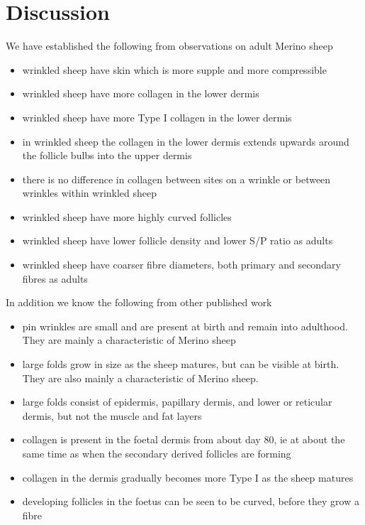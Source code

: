\documentclass[titlepage]{article}  %
\begin{document}
\section{Discussion}
We have established the following from observations on adult Merino sheep
\begin{itemize}
\item wrinkled sheep have skin which is more supple and more compressible
\item wrinkled sheep have more collagen in the lower dermis
\item wrinkled sheep have more Type I collagen in the lower dermis
\item in wrinkled sheep the collagen in the lower dermis extends upwards around the follicle bulbs into the upper dermis
\item there is no difference in collagen between sites on a wrinkle or between wrinkles within wrinkled sheep
\item wrinkled sheep have more highly curved follicles
\item wrinkled sheep have lower follicle density and lower S/P ratio as adults
\item wrinkled sheep have coarser fibre diameters, both primary and secondary fibres as adults
\end{itemize}

In addition we know the following from other published work
\begin{itemize}
\item pin wrinkles are small and are present at birth and remain into adulthood. They are mainly a characteristic of Merino sheep
\item large folds grow in size as the sheep matures, but can be visible at birth. They are also mainly a characteristic of Merino sheep.
\item large folds consist of epidermis, papillary dermis, and lower or reticular dermis, but not the muscle and fat layers 
\item collagen is present in the foetal dermis from about day 80, ie at about the same time as when the secondary derived follicles are forming
\item collagen in the dermis gradually becomes more Type I as the sheep matures 
\item developing follicles in the foetus can be seen to be curved, before they grow a fibre
\end{itemize}
\end{document}
